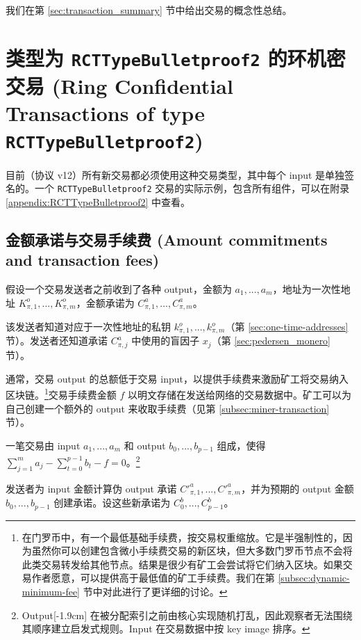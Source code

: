 我们在第 \ref{sec:transaction_summary} 节中给出交易的概念性总结。



\section{类型为 {\tt RCTTypeBulletproof2} 的环机密交易 (Ring Confidential Transactions of type {\tt RCTTypeBulletproof2})}
\label{sec:RCTTypeBulletproof2}

目前（协议 v12）所有新交易都必须使用这种交易类型，其中每个 input 是单独签名的。一个 {\tt RCTTypeBulletproof2} 交易的实际示例，包含所有组件，可以在附录 \ref{appendix:RCTTypeBulletproof2} 中查看。


\subsection{金额承诺与交易手续费 (Amount commitments and transaction fees)}
\label{sec:commitments-and-fees}

假设一个交易发送者之前收到了各种 output，金额为 $a_1, ..., a_m$，地址为一次性地址 $K^o_{\pi,1}, ..., K^o_{\pi,m}$，金额承诺为 $C^a_{\pi,1}, ..., C^a_{\pi,m}$。

该发送者知道对应于一次性地址的私钥 $k^o_{\pi,1}, ..., k^o_{\pi,m}$（第 \ref{sec:one-time-addresses} 节）。发送者还知道承诺 $C^a_{\pi,j}$ 中使用的盲因子 $x_j$（第 \ref{sec:pedersen_monero} 节）。

通常，交易 output 的总额{低于}交易 input，以提供手续费来激励矿工将交易纳入区块链。\footnote{在门罗币中，有一个最低基础手续费，按交易权重缩放。它是半强制性的，因为虽然你可以创建包含微小手续费交易的新区块，但大多数门罗币节点不会将此类交易转发给其他节点。结果是很少有矿工会尝试将它们纳入区块。如果交易作者愿意，可以提供高于最低值的矿工手续费。我们在第 \ref{subsec:dynamic-minimum-fee} 节中对此进行了更详细的讨论。}交易手续费金额 $f$ 以明文存储在发送给网络的交易数据中。矿工可以为自己创建一个额外的 output 来收取手续费（见第 \ref{subsec:miner-transaction} 节）。

一笔交易由 input \(a_1, ..., a_m\) 和 output \(b_0, ..., b_{p-1}\) 组成，使得 \(\sum\limits_{j=1}^m a_j - \sum\limits_{t=0}^{p-1} b_t - f = 0\)。\footnote{Output[-1.9cm] 在被分配索引之前由核心实现随机打乱，因此观察者无法围绕其顺序建立启发式规则。Input 在交易数据中按 key image 排序。}

发送者为 input 金额计算伪 output 承诺 $C'^a_{\pi,1}, ..., C'^a_{\pi,m}$，并为预期的 output 金额 $b_0, ..., b_{p-1}$ 创建承诺。设这些新承诺为 $C^b_0, ..., C^b_{p-1}$。

